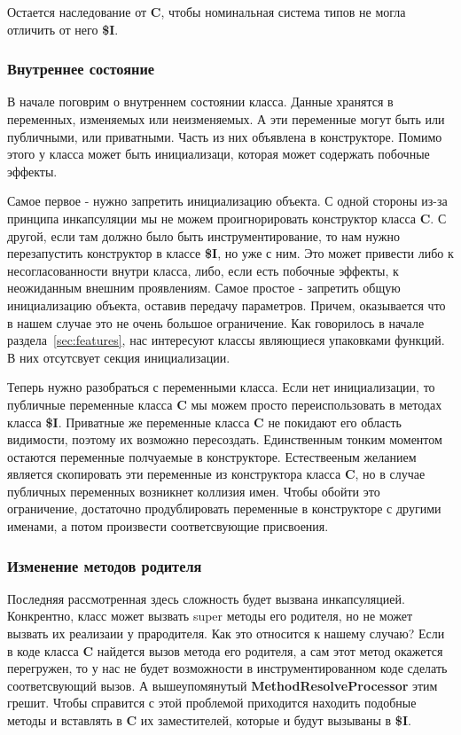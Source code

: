 Остается наследование от \textbf{C}, чтобы номинальная система типов не могла
отличить от него \textbf{\$I}.

\subsubsection{Внутреннее состояние}

В начале поговрим о внутреннем состоянии класса.
Данные хранятся в переменных, изменяемых или неизменяемых.
А эти переменные могут быть или публичными, или приватными.
Часть из них объявлена в конструкторе.
Помимо этого у класса может быть инициализаци, которая может содержать побочные
эффекты.

Самое первое - нужно запретить инициализацию объекта.
С одной стороны из-за принципа инкапсуляции мы не можем проигнорировать
конструктор класса \textbf{C}.
С другой, если там должно было быть инструментирование, то нам нужно перезапустить
конструктор в классе \textbf{\$I}, но уже с ним.
Это может привести либо к несогласованности внутри класса, либо, если есть
побочные эффекты, к неожиданным внешним проявлениям.
Самое простое - запретить общую инициализацию объекта, оставив передачу параметров.
Причем, оказывается что в нашем случае это не очень большое ограничение.
Как говорилось в начале раздела~\ref{sec:features}, нас интересуют классы
являющиеся упаковками функций.
В них отсутсвует секция инициализации.

Теперь нужно разобраться с переменными класса.
Если нет инициализации, то публичные переменные класса \textbf{C} мы можем
просто переиспользовать в методах класса \textbf{\$I}.
Приватные же переменные класса \textbf{C} не покидают его область
видимости, поэтому их возможно пересоздать.
Единственным тонким моментом остаются переменные полчуаемые в конструкторе.
Естествееным желанием является скопировать эти переменные из конструктора
класса \textbf{C}, но в случае публичных переменных возникнет коллизия имен.
Чтобы обойти это ограничение, достаточно продублировать переменные в конструкторе
с другими именами, а потом произвести соответсвующие присвоения.

\subsubsection{Изменение методов родителя}

Последняя рассмотренная здесь сложность будет вызвана инкапсуляцией.
Конкрентно, класс может вызвать super методы его родителя, но не может вызвать
их реализаии у прародителя.
Как это относится к нашему случаю?
Если в коде класса \textbf{C} найдется вызов метода его родителя,
а сам этот метод окажется перегружен, то у нас не будет возможности в
инструментированном коде сделать соответсвующий вызов.
А вышеупомянутый \textbf{MethodResolveProcessor} этим грешит.
Чтобы справится с этой проблемой приходится находить подобные методы и
вставлять в \textbf{C} их заместителей, которые и будут вызываны в \textbf{\$I}.

